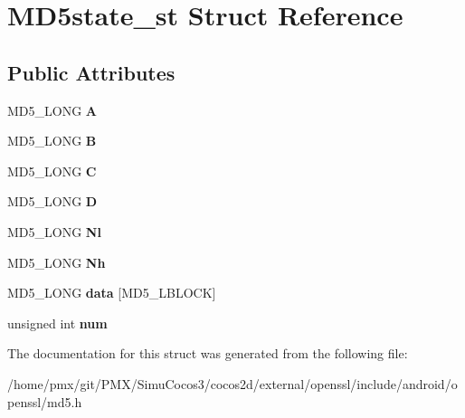 \hypertarget{structMD5state__st}{}\section{M\+D5state\+\_\+st Struct Reference}
\label{structMD5state__st}
\subsection*{Public Attributes}
\begin{DoxyCompactItemize}
\item 
\mbox{\label{structMD5state__st_ac01316cea74aeb98bb8d557f57c85a08}} 
M\+D5\+\_\+\+L\+O\+NG {\bfseries A}
\item 
\mbox{\label{structMD5state__st_a0a0927f6cc209cb0d4565a89af43e59c}} 
M\+D5\+\_\+\+L\+O\+NG {\bfseries B}
\item 
\mbox{\label{structMD5state__st_a90da41912fea04ac78eb4c580744e79b}} 
M\+D5\+\_\+\+L\+O\+NG {\bfseries C}
\item 
\mbox{\label{structMD5state__st_a1bd5cc2fd46230a9b3ca542ce941447e}} 
M\+D5\+\_\+\+L\+O\+NG {\bfseries D}
\item 
\mbox{\label{structMD5state__st_accb86d088daeafde5a370fb8a2961bd7}} 
M\+D5\+\_\+\+L\+O\+NG {\bfseries Nl}
\item 
\mbox{\label{structMD5state__st_a2eb6f766a15bf4987f75eda8f954e1f2}} 
M\+D5\+\_\+\+L\+O\+NG {\bfseries Nh}
\item 
\mbox{\label{structMD5state__st_a5e207f37b7e0d5716467a812a48e5cbc}} 
M\+D5\+\_\+\+L\+O\+NG {\bfseries data} \mbox{[}M\+D5\+\_\+\+L\+B\+L\+O\+CK\mbox{]}
\item 
\mbox{\label{structMD5state__st_ae35c099cfb7bdf972b4419998c7efc92}} 
unsigned int {\bfseries num}
\end{DoxyCompactItemize}


The documentation for this struct was generated from the following file\+:\begin{DoxyCompactItemize}
\item 
/home/pmx/git/\+P\+M\+X/\+Simu\+Cocos3/cocos2d/external/openssl/include/android/openssl/md5.\+h\end{DoxyCompactItemize}

